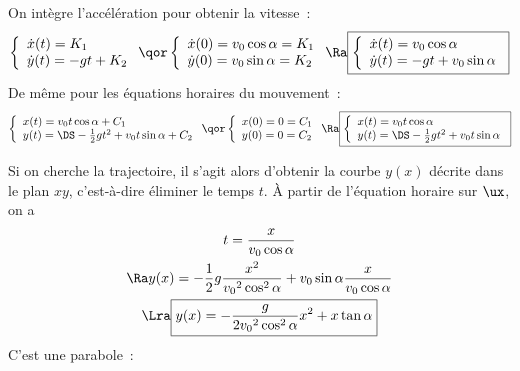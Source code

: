 \documentclass[../main/main.tex]{subfiles}
\begin{document}
\begin{enumerate}[resume, label=\sqenumi]
        On intègre l'accélération pour obtenir la vitesse~:
        \[
            \left\{
                \begin{array}{l}
                    \dot{x}(t) = K_1\\
                    \dot{y}(t) = -gt + K_2
                \end{array}
            \right.
            \qor
            \left\{
                \begin{array}{l}
                    \dot{x}(0) = v_0\cos\alpha = K_1\\
                    \dot{y}(0) = v_0\sin\alpha = K_2
                \end{array}
            \right.
            \Ra
            \boxed{
            \left\{
                \begin{array}{l}
                    \dot{x}(t) = v_0\cos\alpha\\
                    \dot{y}(t) = -gt + v_0\sin\alpha
                \end{array}
            \right.
            }
        \]
        De même pour les équations horaires du mouvement~:
        \[
            \left\{
                \begin{array}{l}
                    x(t) = v_0t\cos\alpha + C_1\\
                    y(t) = \DS -\frac{1}{2}gt^2 + v_0t\sin\alpha + C_2
                \end{array}
            \right.
            \qor
            \left\{
                \begin{array}{l}
                    x(0) = 0 = C_1\\
                    y(0) = 0 = C_2
                \end{array}
            \right.
            \Ra
            \boxed{
            \left\{
                \begin{array}{l}
                    x(t) = v_0t\cos\alpha\\
                    y(t) = \DS -\frac{1}{2}gt^2 + v_0t\sin\alpha
                \end{array}
            \right.
            }
        \]
\end{enumerate}
Si on cherche la trajectoire, il s'agit alors d'obtenir la courbe $y(x)$ décrite
dans le plan $xy$, c'est-à-dire éliminer le temps $t$. À partir de l'équation
horaire sur $\ux$, on a
\begin{gather*}
    t = \frac{x}{v_0\cos\alpha}\\
    \Ra
    y(x) = - \frac{1}{2}g \frac{x^2}{v_0{}^2\cos^2\alpha} + v_0\sin\alpha
    \frac{x}{v_0\cos\alpha}
    \\
    \Lra
    \boxed{y(x) = - \frac{g}{2v_0{}^2\cos^2\alpha}x^2 + x\tan\alpha}
\end{gather*}
C'est une parabole~:
\end{document}
